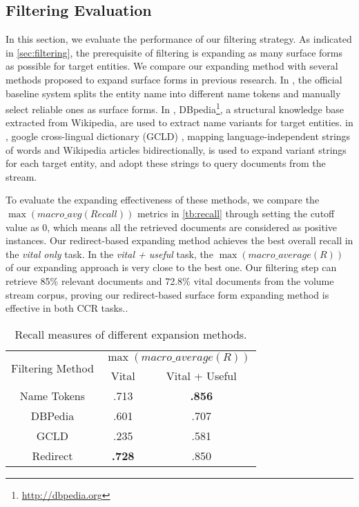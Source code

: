 \documentclass{sig-alternate}
\begin{document}
\subsection{Filtering Evaluation}
In this section, we evaluate the performance of our filtering strategy. As indicated in \autoref{sec:filtering}, the prerequisite of filtering is expanding as many surface forms as possible for target entities. We compare our expanding method with several methods proposed to expand surface forms in previous research. In \cite{overviewkba2013}, the official baseline system splits the entity name into different name tokens and manually select reliable ones as surface forms. In \cite{Balog:2013:MCA:2491748.2491775, Liu:2013:LRE:2512405.2512407}, DBpedia\footnote{\url{http://dbpedia.org}}, a structural knowledge base extracted from Wikipedia, are used to extract name variants for target entities. in \cite{araujo2013cwi}, google cross-lingual dictionary (GCLD) \cite{spitkovsky2012lrec}, mapping language-independent strings of words and Wikipedia articles bidirectionally, is used to expand variant strings for each target entity, and adopt these strings to query documents from the stream.

To evaluate the expanding effectiveness of these methods, we compare the $\max(macro\_avg(Recall))$ metrics in \autoref{tb:recall} through setting the cutoff value as 0, which means all the retrieved documents are considered as positive instances. Our redirect-based expanding method achieves the best overall recall in the \textit{vital only} task.
In the \textit{vital + useful} task, the $\max(macro\_average(R))$ of our expanding approach is very close to the best one. Our filtering step can retrieve 85\% relevant documents and 72.8\% vital documents from the volume stream corpus, proving our redirect-based surface form expanding method is effective in both CCR tasks.. 
\begin{table}[thbp]
\centering
\caption{Recall measures of different expansion methods.}\label{tb:recall}
\begin{tabular}{ccc} \hline
\multirow{2}{*}{Filtering Method} & \multicolumn{2}{c}{ $\max(macro\_average(R))$} \\ \cline{2-3} & Vital & Vital + Useful \\ \hline
Name Tokens & .713  & \textbf{.856} \\\hline
DBPedia  & .601  & .707 \\ \hline
GCLD & .235  & .581 \\ \hline
Redirect & \textbf{.728} & .850 \\ \hline
\end{tabular}
\end{table}
\end{document}
